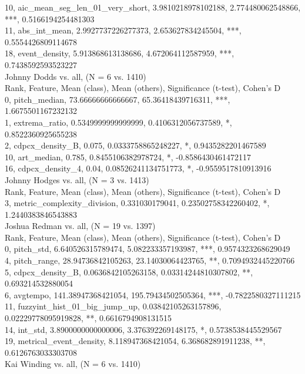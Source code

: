 10, aic_mean_seg_len_01_very_short, 3.9810218978102188, 2.774480062548866, ***, 0.5166194254481303\\
11, abs_int_mean, 2.9927737226277373, 2.653627834245504, ***, 0.5554426809114678\\
18, event_density, 5.913868613138686, 4.672064112587959, ***, 0.7438592593523227\\
Johnny Dodds vs. all, (N = 6 vs. 1410)\\
Rank, Feature, Mean (class), Mean (others), Significance (t-test), Cohen's D\\
0, pitch_median, 73.66666666666667, 65.36418439716311, ***, 1.6675501167232132\\
1, extrema_ratio, 0.5349999999999999, 0.4106312056737589, *, 0.8522360925655238\\
2, cdpcx_density_B, 0.075, 0.0333758865248227, *, 0.9435282201467589\\
10, art_median, 0.785, 0.8455106382978724, *, -0.8586430461472117\\
16, cdpcx_density_4, 0.04, 0.08526241134751773, *, -0.9559517810913916\\
Johnny Hodges vs. all, (N = 3 vs. 1413)\\
Rank, Feature, Mean (class), Mean (others), Significance (t-test), Cohen's D\\
3, metric_complexity_division, 0.331030179041, 0.23502758342260402, *, 1.2440383846543883\\
Joshua Redman vs. all, (N = 19 vs. 1397)\\
Rank, Feature, Mean (class), Mean (others), Significance (t-test), Cohen's D\\
0, pitch_std, 6.640526315789474, 5.082233357193987, ***, 0.9574323268629049\\
4, pitch_range, 28.94736842105263, 23.14030064423765, **, 0.7094932445220766\\
5, cdpcx_density_B, 0.0636842105263158, 0.03314244810307802, **, 0.693214532880054\\
6, avgtempo, 141.38947368421054, 195.79434502505364, ***, -0.7822580327111215\\
11, fuzzyint_hist_01_big_jump_up, 0.03842105263157896, 0.02229778095919828, **, 0.6616794908131515\\
14, int_std, 3.8900000000000006, 3.376392269148175, *, 0.5738538445529567\\
19, metrical_event_density, 8.118947368421054, 6.368682891911238, **, 0.6126763033303708\\
Kai Winding vs. all, (N = 6 vs. 1410)\\
